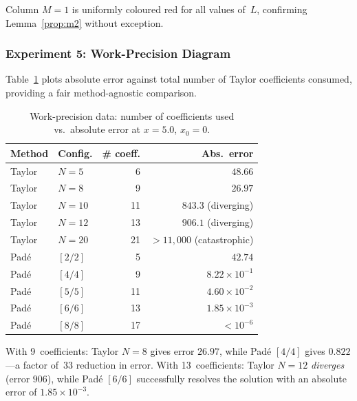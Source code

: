 \documentclass[12pt,a4paper]{article}
\theoremstyle{definition}
\theoremstyle{remark}
\begin{document}
Column $M = 1$ is uniformly coloured red for all values of~$L$,
confirming Lemma~\ref{prop:m2} without exception.

\subsubsection{Experiment 5: Work-Precision Diagram}

Table~\ref{tab:work_prec} plots absolute error against total number
of Taylor coefficients consumed, providing a fair method-agnostic
comparison.

\begin{table}[H]
  \centering
  \caption{Work-precision data: number of coefficients used vs.\
    absolute error at $x = 5.0$, $x_0 = 0$.}
  \label{tab:work_prec}
  \renewcommand{\arraystretch}{1.15}
  \begin{tabular}{@{}llrr@{}}
    \toprule
    \textbf{Method} & \textbf{Config.}
      & \textbf{\# coeff.} & \textbf{Abs.\ error}\\
    \midrule
    Taylor & $N = 5$  &  6 & $48.66$ \\
    Taylor & $N = 8$  &  9 & $26.97$ \\
    Taylor & $N = 10$ & 11 & $843.3$ (diverging) \\
    Taylor & $N = 12$ & 13 & $906.1$ (diverging) \\
    Taylor & $N = 20$ & 21 & $>11{,}000$ (catastrophic) \\
    \midrule
    Padé & $[2/2]$ &  5 & $42.74$ \\
    Padé & $[4/4]$ &  9 & $8.22 \times 10^{-1}$ \\
    Padé & $[5/5]$ & 11 & $4.60 \times 10^{-2}$ \\
    Padé & $[6/6]$ & 13 & $1.85 \times 10^{-3}$ \\
    Padé & $[8/8]$ & 17 & $< 10^{-6}$ \\
    \bottomrule
  \end{tabular}
\end{table}

With 9~coefficients: Taylor $N = 8$ gives error $26.97$, while Padé
$[4/4]$ gives $0.822$---a factor of~$33$ reduction in error.  With
13~coefficients: Taylor $N = 12$ \emph{diverges} (error $906$), while
Padé $[6/6]$ successfully resolves the solution with an absolute error of $1.85 \times 10^{-3}$.
\end{document}
